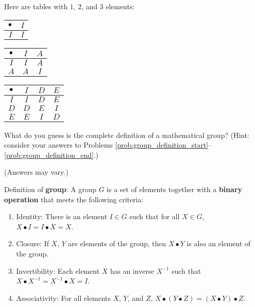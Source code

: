 \documentclass[../gatm_answers.tex]{subfiles}
\begin{document}
Here are tables with $1$, $2$, and $3$ elements:\\
\begin{center}
	\begin{minipage}{0.3\textwidth}
		\centering
		\begin{tabular}{c|c}
			\hline
			$\bullet$ & $I$ \\ \hline
			\rowcolor{light-gray}
			$I$ & $I$ \\ \hline
		\end{tabular}
	\end{minipage}
	\hfill
	\begin{minipage}{0.3\textwidth}
		\centering
		\begin{tabular}{c|cc}
			\hline
			$\bullet$ & $I$ & $A$ \\ \hline
			\rowcolor{light-gray}
			$I$ & $I$ & $A$ \\
			$A$ & $A$ & $I$ \\ \hline
		\end{tabular}
	\end{minipage}
	\hfill
	\begin{minipage}{0.3\textwidth}
		\centering
		\begin{tabular}{c|ccc}
			\hline
			$\bullet$ & $I$ & $D$ & $E$ \\ \hline
			\rowcolor{light-gray}
			$I$ & $I$ & $D$ & $E$ \\
			$D$ & $D$ & $E$ & $I$ \\
			\rowcolor{light-gray}
			$E$ & $E$ & $I$ & $D$ \\ \hline
		\end{tabular}
	\end{minipage}
\end{center}

\begin{outer_problem}
	\item What do you guess is the complete definition of a mathematical group?
	      (Hint: consider your answers to Problems \ref{prob:group_definition_start}--\ref{prob:group_definition_end}.)
\end{outer_problem}

\noindent (Answers may vary.)

Definition of \textbf{group}: A group $G$ is a set of elements together with a \textbf{binary operation} that meets the following criteria:
\begin{enumerate}[label=(\alph*)]
\item Identity: There is an element $I\in G$ such that for all $X\in G$, $X\bullet I = I\bullet X = X$.
\item Closure: If $X$, $Y$ are elements of the group, then $X\bullet Y$ is also an element of the group.
\item Invertibility: Each element $X$ has an inverse $X^{-1}$ such that $X\bullet X^{-1} = X^{-1}\bullet X = I$.
\item Associativity: For all elements $X$, $Y$, and $Z$, $X\bullet (Y\bullet Z) = (X\bullet Y) \bullet Z$.
\end{enumerate}
\end{document}
